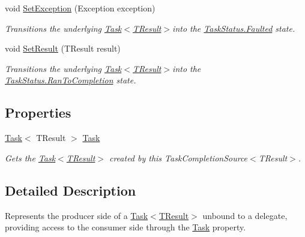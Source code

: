 \begin{DoxyCompactItemize}
void \hyperlink{class_system_1_1_threading_1_1_tasks_1_1_task_completion_source_a8d3f5e987ba59b9e13bec97fe318474f}{Set\+Exception} (Exception exception)
\begin{DoxyCompactList}\small\item\em Transitions the underlying \hyperlink{class_system_1_1_threading_1_1_tasks_1_1_task}{Task$<$\+T\+Result$>$}into the \hyperlink{namespace_system_1_1_threading_1_1_tasks_a60ab70a6c84627853d6b1056f1edebcfa2b310d05c23325e2935ec87b25a60b8f}{Task\+Status.\+Faulted} state. \end{DoxyCompactList}\item 
void \hyperlink{class_system_1_1_threading_1_1_tasks_1_1_task_completion_source_a36ab907315892a8b35ac4372c3f408c4}{Set\+Result} (T\+Result result)
\begin{DoxyCompactList}\small\item\em Transitions the underlying \hyperlink{class_system_1_1_threading_1_1_tasks_1_1_task}{Task$<$\+T\+Result$>$}into the \hyperlink{namespace_system_1_1_threading_1_1_tasks_a60ab70a6c84627853d6b1056f1edebcfaafe3c20f08a3dd6c4cab23d979c8f1e9}{Task\+Status.\+Ran\+To\+Completion} state. \end{DoxyCompactList}\end{DoxyCompactItemize}
\subsection*{Properties}
\begin{DoxyCompactItemize}
\item 
\hyperlink{class_system_1_1_threading_1_1_tasks_1_1_task}{Task}$<$ T\+Result $>$ \hyperlink{class_system_1_1_threading_1_1_tasks_1_1_task_completion_source_ae2f74ab5ed620ed6590e5f92637b3510}{Task}
\begin{DoxyCompactList}\small\item\em Gets the \hyperlink{class_system_1_1_threading_1_1_tasks_1_1_task}{Task$<$\+T\+Result$>$} created by this Task\+Completion\+Source$<$\+T\+Result$>$. \end{DoxyCompactList}\end{DoxyCompactItemize}


\subsection{Detailed Description}
Represents the producer side of a \hyperlink{class_system_1_1_threading_1_1_tasks_1_1_task}{Task$<$\+T\+Result$>$} unbound to a delegate, providing access to the consumer side through the \hyperlink{class_system_1_1_threading_1_1_tasks_1_1_task}{Task} property. 


